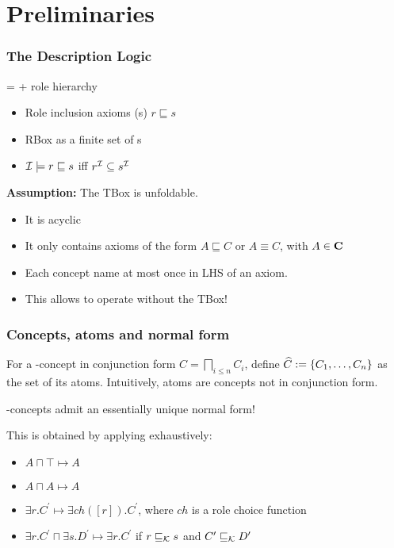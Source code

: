 \documentclass{beamer}
\begin{document}
\section{Preliminaries}

\begin{frame}
  \frametitle{The \elh{} Description Logic}
  \elh = \el + \alert{role hierarchy}
  \begin{itemize}[<+->]
    \item \alert{Role inclusion axioms} (\ria{}s) \(r \sqsubseteq s\)
    \item \alert{RBox} as a finite set of \ria{}s
    \item \(\mathcal{I} \models r \sqsubseteq s\) iff \(r^{\mathcal{I}} \subseteq s^{\mathcal{I}}\)
  \end{itemize}
  \textbf{Assumption:} The TBox is \alert{unfoldable}.
  \begin{itemize}[<+->]
    \item It is acyclic
    \item It only contains axioms of the form
    \(A \sqsubseteq C\) or \(A \equiv C\), with \(A \in \mathbf{C}\)
    \item Each concept name at most once in LHS of an axiom.
    \item This allows to operate without the TBox!
  \end{itemize}
\end{frame}

\begin{frame}
  \frametitle{Concepts, atoms and normal form}
  For a \elh-concept in conjunction form
  \(C = \bigsqcap_{i \le n} C_i\), define
  \(
    \widehat{C} := \lbrace C_1,\dotsc,C_n \rbrace
  \)
  as the set of its \alert{atoms}.
  Intuitively, atoms are concepts not in
  conjunction form.

  \elh-concepts admit an essentially unique \alert{normal form}!

  This is obtained by applying exhaustively:
  \begin{itemize}[<+->]
    \item \(A \sqcap \top \mapsto A\)
    \item \(A \sqcap A \mapsto A\)
    \item \(\exists{}r.C^\prime \mapsto%
           \exists{}ch([r]).C^\prime\),
           where \(ch\) is a role choice function
    \item \(\exists{}r.C^\prime \sqcap%
           \exists{}s.D^\prime \mapsto%
          \exists{}r.C^\prime\) if
          \(r\sqsubseteq_{\mathcal{K}}s\) and
          \(C^\prime \sqsubseteq_{\mathcal{K}} D^\prime\)
  \end{itemize}
\end{frame}
\end{document}
